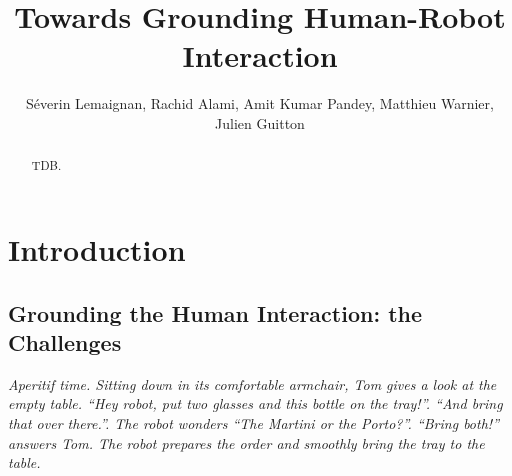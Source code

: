 \documentclass{svmult}
\begin{document}


\title*{Towards Grounding Human-Robot Interaction}

\author{
Séverin Lemaignan,
Rachid Alami,
Amit Kumar Pandey,
Matthieu Warnier,
Julien Guitton
}


\maketitle

\listoffixmes

\clearpage

\setcounter{minitocdepth}{2}
\dominitoc


\begin{abstract}
TDB.
\end{abstract}



\section{Introduction}

\subsection{Grounding the Human Interaction: the Challenges}

{\em Aperitif time. Sitting down in its comfortable armchair, Tom gives a look
at the empty table. ``{\em Hey robot, put two glasses and this bottle on the
tray!}''. ``{\em And bring that over there.}''. The robot wonders ``{\em The
Martini or the Porto?}''. ``{\em Bring both!}'' answers Tom. The robot prepares
the order and smoothly bring the tray to the table.}
\end{document}
